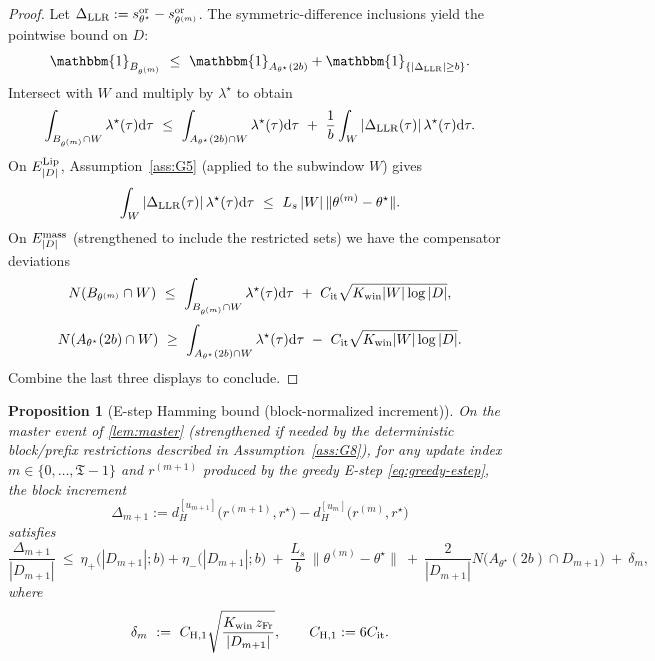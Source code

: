 \documentclass{statsoc}
\newtheorem{proposition}[proposition]{Proposition}
\newcommand{\dd}{\mathrm{d}}
\newcommand{\1}{\mathbbm{1}}
\newcommand{\Tmax}{\mathfrak{T}}
\begin{document}
\begin{proof}
Let $\Delta_{\rm LLR}:=s_{\theta^\star}^{\rm or}-s_{\theta^{(m)}}^{\rm or}$.
The symmetric-difference inclusions yield the pointwise bound on $D$:
\[
\1_{B_{\theta^{(m)}}}
\ \le\ 
\1_{A_{\theta^\star}(2b)} + \1_{\{|\Delta_{\rm LLR}|\ge b\}}.
\]
Intersect with $W$ and multiply by $\lambda^\star$ to obtain
\[
\int_{B_{\theta^{(m)}}\cap W}\lambda^\star(\tau)\dd\tau
\ \le\ 
\int_{A_{\theta^\star}(2b)\cap W}\lambda^\star(\tau)\dd\tau
\ +\ 
\frac{1}{b}\int_W |\Delta_{\rm LLR}(\tau)|\,\lambda^\star(\tau)\dd\tau.
\]
On $E^{\rm Lip}_{|D|}$, Assumption~\ref{ass:G5} (applied to the subwindow $W$) gives
\[
\int_W |\Delta_{\rm LLR}(\tau)|\,\lambda^\star(\tau)\dd\tau
\ \le\ 
L_s\,|W|\,\|\theta^{(m)}-\theta^\star\|.
\]
On $E^{\rm mass}_{|D|}$ (strengthened to include the restricted sets) we have the compensator deviations
\[
N(B_{\theta^{(m)}}\cap W)\ \le\ \int_{B_{\theta^{(m)}}\cap W}\lambda^\star(\tau)\dd\tau\ +\ C_{\rm it}\sqrt{K_{\rm win}|W|\log|D|},
\]
\[
N(A_{\theta^\star}(2b)\cap W)\ \ge\ \int_{A_{\theta^\star}(2b)\cap W}\lambda^\star(\tau)\dd\tau\ -\ C_{\rm it}\sqrt{K_{\rm win}|W|\log|D|}.
\]
Combine the last three displays to conclude.
\end{proof}



\begin{proposition}[E-step Hamming bound (block-normalized increment)]\label{prop:Estep}
On the master event of \cref{lem:master} (strengthened if needed by the deterministic block/prefix restrictions
described in Assumption~\ref{ass:G8}), for any update index $m\in\{0,\dots,\Tmax-1\}$ and
$r^{(m+1)}$ produced by the greedy E-step \eqref{eq:greedy-estep}, the block increment
\[
\Delta_{m+1}
:=d_H^{[u_{m+1}]}\!\big(r^{(m+1)},r^\star\big)-d_H^{[u_m]}\!\big(r^{(m)},r^\star\big)
\]
satisfies
\[
\frac{\Delta_{m+1}}{|D_{m+1}|}
\ \le\ \eta_+\big(|D_{m+1}|;b\big) + \eta_-\big(|D_{m+1}|;b\big)
\ +\ \frac{L_s}{b}\,\|\theta^{(m)}-\theta^\star\|
\ +\ \frac{2}{|D_{m+1}|}N\!\big(A_{\theta^\star}(2b)\cap D_{m+1}\big)\ +\ \delta_m,
\]
where
\[
\delta_m\ :=\ C_{\rm H,1}\sqrt{\frac{K_{\rm win}\,z_{\rm Fr}}{|D_{m+1}|}},
\qquad C_{\rm H,1}:=6C_{\rm it}.
\]
\end{proposition}
\end{document}
